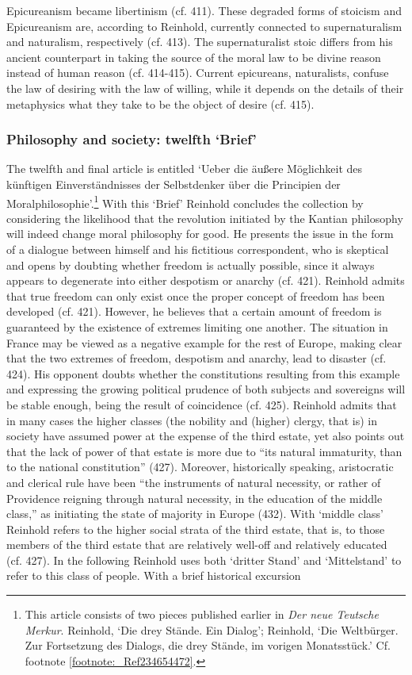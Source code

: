 Epicureanism became libertinism (cf. 411). These degraded forms of stoicism and Epicureanism are, according to Reinhold, currently connected to supernaturalism and naturalism, respectively (cf. 413). The supernaturalist stoic differs from his ancient counterpart in taking the source of the moral law to be divine reason instead of human reason (cf. 414{-}415). Current epicureans, naturalists, confuse the law of desiring with the law of willing, while it depends on the details of their metaphysics what they take to be the object of desire (cf. 415). 


\subsubsection{Philosophy and society: twelfth `Brief'}


The twelfth and final article is entitled `Ueber die \"{a}u\ss{}ere M\"{o}glichkeit des k\"{u}nftigen Einverst\"{a}ndnisses der Selbstdenker \"{u}ber die Principien der Moralphilosophie'.\footnote{ This article consists of two pieces published earlier in \textit{Der neue Teutsche Merkur}. Reinhold, `Die drey St\"{a}nde. Ein Dialog'; Reinhold, `Die Weltb\"{u}rger. Zur Fortsetzung des Dialogs, die drey St\"{a}nde, im vorigen Monatsst\"{u}ck.' Cf. footnote \ref{footnote:_Ref234654472}. } With this `Brief' Reinhold concludes the collection by considering the likelihood that the revolution initiated by the Kantian philosophy will indeed change moral philosophy for good. He presents the issue in the form of a dialogue between himself and his fictitious correspondent, who is skeptical and opens by doubting whether freedom is actually possible, since it always appears to degenerate into either despotism or anarchy (cf. 421). Reinhold admits that true freedom can only exist once the proper concept of freedom has been developed (cf. 421). However, he believes that a certain amount of freedom is guaranteed by the existence of extremes limiting one another. The situation in France may be viewed as a negative example for the rest of Europe, making clear that the two extremes of freedom, despotism and anarchy, lead to disaster (cf. 424). His opponent doubts whether the constitutions resulting from this example and expressing the growing political prudence of both subjects and sovereigns will be stable enough, being the result of coincidence (cf. 425). Reinhold admits that in many cases the higher classes (the nobility and (higher) clergy, that is) in society have assumed power at the expense of the third estate, yet also points out that the lack of power of that estate is more due to ``its natural immaturity, than to the national constitution'' (427). Moreover, historically speaking, aristocratic and clerical rule have been ``the instruments of natural necessity, or rather of Providence reigning through natural necessity, in the education of the middle class,'' as initiating the state of majority in Europe (432). With `middle class' Reinhold refers to the higher social strata of the third estate, that is, to those members of the third estate that are relatively well{-}off and relatively educated (cf. 427). In the following Reinhold uses both `dritter Stand' and `Mittelstand' to refer to this class of people. With a brief historical excursion 